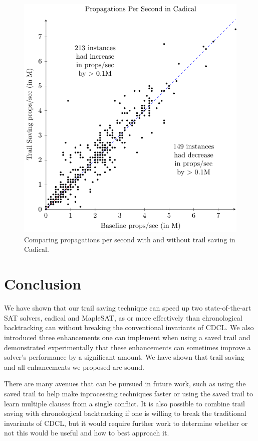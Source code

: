 \documentclass[runningheads]{llncs}
\newcommand{\sat}{SAT\xspace}
\begin{document}
\begin{figure}\centering\includegraphics[scale=0.7]{figures/scatter.pdf}\caption{Comparing propagations per second with and without trail saving in Cadical.}\label{fig:props}\end{figure}

\section{Conclusion}
We have shown that our trail saving technique can speed up two
state-of-the-art \sat solvers, cadical and MapleSAT, as or more
effectively than chronological backtracking can without breaking the
conventional invariants of CDCL. We also introduced three enhancements
one can implement when using a saved trail and demonstrated
experimentally that these enhancements can sometimes improve a
solver's performance by a significant amount. We have shown that trail
saving and all enhancements we proposed are sound.

There are many avenues that can be pursued in future work, such as
using the saved trail to help make inprocessing techniques faster or
using the saved trail to learn multiple clauses from a single
conflict. It is also possible to combine trail saving with
chronological backtracking if one is willing to break the traditional
invariants of CDCL, but it would require further work to determine
whether or not this would be useful and how to best approach it.
\end{document}
